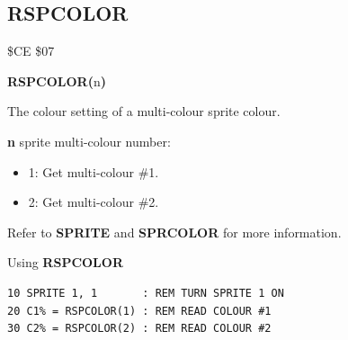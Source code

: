 \subsection{RSPCOLOR}
\begin{description}[leftmargin=2cm,style=nextline]
\item [Token:]    \$CE \$07

\item [Format:]   {\bf RSPCOLOR(}n{\bf)}

\item [Returns:]  The colour setting of a multi-colour sprite colour.

                  {\bf n} sprite multi-colour number:

                  \begin{itemize}
                     \item 1: Get multi-colour \#1.
                     \item 2: Get multi-colour \#2.
                  \end{itemize}

\item [Remarks:]  Refer to {\bf SPRITE} and {\bf SPRCOLOR} for more information.

\item [Example:]  Using {\bf RSPCOLOR}

\begin{tcolorbox}[colback=black,coltext=white]
\verbatimfont{\codefont}
\begin{verbatim}
10 SPRITE 1, 1       : REM TURN SPRITE 1 ON
20 C1% = RSPCOLOR(1) : REM READ COLOUR #1
30 C2% = RSPCOLOR(2) : REM READ COLOUR #2
\end{verbatim}
\end{tcolorbox}
\end{description}


\newpage
